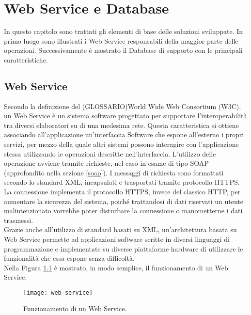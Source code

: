 
\chapter{Web Service e Database}
\label{cap:sviluppo-software}

In questo capitolo sono trattati gli elementi di base delle soluzioni sviluppate. In primo luogo sono illustrati i Web Service responsabili della maggior parte delle operazioni. Successivamente è mostrato il Database di supporto con le principali caratteristiche.


\section{Web Service}

Secondo la definizione del (GLOSSARIO)World Wide Web Consortium (W3C), un Web Service è un sistema software progettato per supportare l'interoperabilità tra diversi elaboratori su di una medesima rete.
Questa caratteristica si ottiene associando all'applicazione un'interfaccia Software che espone all'esterno i propri servizi, per mezzo della quale altri sistemi possono interagire con l'applicazione stessa utilizzando le operazioni descritte nell'interfaccia. L'utilizzo delle operazione avviene tramite richieste, nel caso in esame di tipo SOAP (approfondito nella sezione \ref{soap}). I messaggi di richiesta sono formattati secondo lo standard XML, incapsulati e trasportati tramite protocollo HTTPS. 
La connessione implementa il protocollo HTTPS, invece del classico HTTP, per aumentare la sicurezza del sistema, poiché trattandosi di dati riservati un utente malintenzionato vorrebbe poter disturbare la connessione o manometterne i dati trasmessi.\\
Grazie anche all'utilizzo di standard basati su XML, un'architettura basata su Web Service permette ad applicazioni software scritte in diversi linguaggi di programmazione e implementate su diverse piattaforme hardware di utilizzare le funzionalità che essa espone senza difficoltà.
\\Nella Figura \ref{webservice} è mostrato, in modo semplice, il funzionamento di un Web Service.

\begin{figure}[!h] 
    \centering 
    \texttt{[image: web-service]} 
    \caption{Funzionamento di un Web Service.}
    \label{webservice}
\end{figure}


